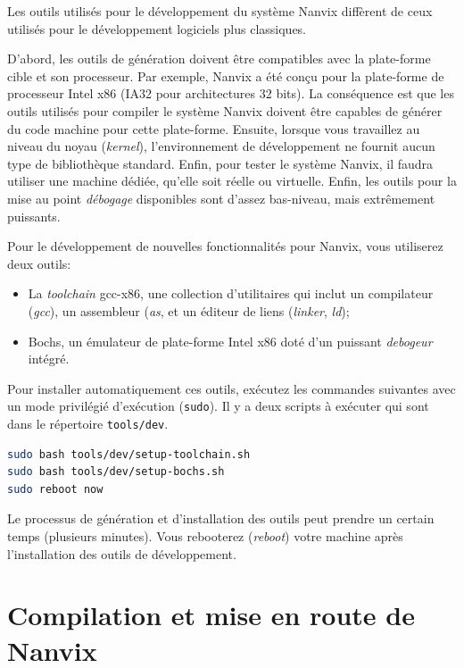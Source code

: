 \documentclass[11pt]{article}
\begin{document}
Les outils utilisés pour le développement du système Nanvix diffèrent
de ceux utilisés pour le développement logiciels plus classiques.

D'abord, les outils de génération doivent être compatibles avec la
plate-forme cible et son processeur. Par exemple, Nanvix a été conçu
pour la plate-forme de processeur Intel x86 (IA32 pour architectures
32 bits).  La conséquence est que les outils utilisés pour compiler le
système Nanvix doivent être capables de générer du code machine pour
cette plate-forme. Ensuite, lorsque vous travaillez au niveau du noyau
(\textit {kernel}), l'environnement de développement ne fournit aucun
type de bibliothèque standard. Enfin, pour tester le système Nanvix,
il faudra utiliser une machine dédiée, qu'elle soit réelle ou
virtuelle. Enfin, les outils pour la mise au point \textit{débogage}
disponibles sont d'assez bas-niveau, mais extrêmement puissants.

Pour le développement de nouvelles fonctionnalités pour Nanvix,
vous utiliserez deux outils:

\begin{itemize}
\item La \textit {toolchain} gcc-x86, une collection d'utilitaires qui
  inclut un compilateur (\textit{gcc}), un assembleur (\textit{as},
  et un éditeur de liens (\textit {linker}, \textit{ld});

\item Bochs, un émulateur de plate-forme Intel x86 doté d'un puissant
  \textit {debogeur} intégré.
\end{itemize}

Pour installer automatiquement ces outils, exécutez les commandes suivantes
avec un mode privilégié d'exécution (\texttt{sudo}). Il y a deux
scripts à exécuter qui sont dans le répertoire \texttt{tools/dev}.\\

\begin{lstlisting}[language=bash,numbers=none,frame=single]
sudo bash tools/dev/setup-toolchain.sh
sudo bash tools/dev/setup-bochs.sh
sudo reboot now
\end{lstlisting}

\vspace{0.3cm} Le processus de génération et d'installation des outils
peut prendre un certain temps (plusieurs minutes). Vous rebooterez
(\textit{reboot}) votre machine après l'installation des outils
de développement.

\section{Compilation et mise en route de Nanvix}
\label{sec:compilation}
\end{document}
